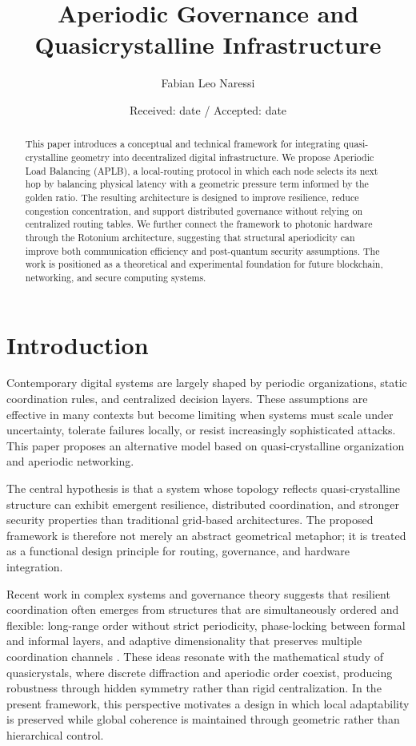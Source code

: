 \documentclass[smallextended]{svjour3}
\title{Aperiodic Governance and Quasicrystalline Infrastructure}
\author{Fabian Leo Naressi}
\institute{Fabian Leo Naressi \at Senemos\`ia Punto Zero, Italy \\
\email{senemosiapuntozero@gmail.com}}
\date{Received: date / Accepted: date}
\begin{document}
\maketitle

\begin{abstract}
This paper introduces a conceptual and technical framework for integrating quasi-crystalline geometry into decentralized digital infrastructure. We propose Aperiodic Load Balancing (APLB), a local-routing protocol in which each node selects its next hop by balancing physical latency with a geometric pressure term informed by the golden ratio. The resulting architecture is designed to improve resilience, reduce congestion concentration, and support distributed governance without relying on centralized routing tables. We further connect the framework to photonic hardware through the Rotonium architecture, suggesting that structural aperiodicity can improve both communication efficiency and post-quantum security assumptions. The work is positioned as a theoretical and experimental foundation for future blockchain, networking, and secure computing systems.
\end{abstract}

\section{Introduction}
Contemporary digital systems are largely shaped by periodic organizations, static coordination rules, and centralized decision layers. These assumptions are effective in many contexts but become limiting when systems must scale under uncertainty, tolerate failures locally, or resist increasingly sophisticated attacks. This paper proposes an alternative model based on quasi-crystalline organization and aperiodic networking.

The central hypothesis is that a system whose topology reflects quasi-crystalline structure can exhibit emergent resilience, distributed coordination, and stronger security properties than traditional grid-based architectures. The proposed framework is therefore not merely an abstract geometrical metaphor; it is treated as a functional design principle for routing, governance, and hardware integration.

Recent work in complex systems and governance theory suggests that resilient coordination often emerges from structures that are simultaneously ordered and flexible: long-range order without strict periodicity, phase-locking between formal and informal layers, and adaptive dimensionality that preserves multiple coordination channels \citep{shechtman1984metallic,acemoglu2015state,elliott2014financial,haldane2011systemic}. These ideas resonate with the mathematical study of quasicrystals, where discrete diffraction and aperiodic order coexist, producing robustness through hidden symmetry rather than rigid centralization. In the present framework, this perspective motivates a design in which local adaptability is preserved while global coherence is maintained through geometric rather than hierarchical control.
\end{document}
